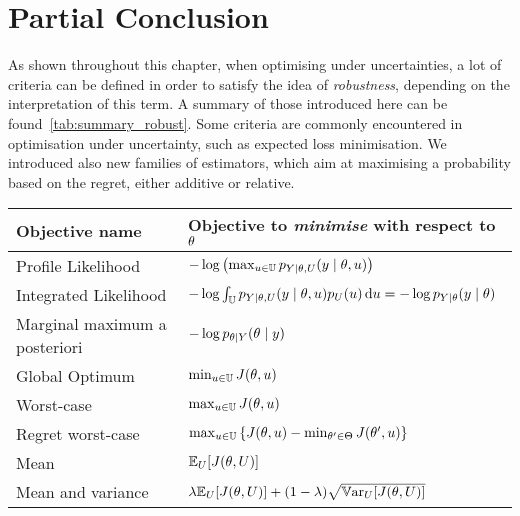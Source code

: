 \documentclass[../../Main_ManuscritThese.tex]{subfiles}
\begin{document}
\section{Partial Conclusion}
\label{sec:ch3_partial_ccl}
As shown throughout this chapter, when optimising under uncertainties, a
lot of criteria can be defined in order to satisfy the idea of
\emph{robustness}, depending on the interpretation of this term. A
summary of those introduced here can be
found~\cref{tab:summary_robust}. Some criteria are commonly
encountered in optimisation under uncertainty, such as expected loss
minimisation. We introduced also new families of estimators, which aim
at maximising a probability based on the regret, either additive or
relative.
\begin{table}[ht]
  \centering
  \begin{tabular}{ll}
    \toprule
    Objective name                & Objective to \emph{minimise} with respect to  $\theta$                                                                                 \\ \midrule
    Profile Likelihood            & $-\log \left(\max_{u \in \mathbb{U}} p_{Y \mid \theta, U}(y \mid \theta, u)\right)$                                       \\
    Integrated Likelihood         & $-\log \int_{\mathbb{U}} p_{Y \mid \theta, U}(y \mid \theta, u)p_{U}(u) \,\mathrm{d}u=-\log p_{Y\mid \theta}(y\mid \theta)$ \\
    Marginal maximum a posteriori & $-\log p_{\theta\mid Y}(\theta \mid y)$                                                                                      \\ \midrule
    Global Optimum                & $\min_{u\in\mathbb{U}} J(\theta, u)$                                                                                     \\
    Worst-case                    & $\max_{u \in \mathbb{U}} J(\theta, u)$                                                                                   \\
    Regret worst-case             & $\max_{u\in\mathbb{U}}\left\{J(\theta, u) - \min_{\theta^{\prime}\in\Theta} J(\theta^{\prime}, u)\right\}$                  \\ \midrule
    Mean                          & $\mathbb{E}_{U}[J(\theta, U)]$                                                                                               \\
    Mean and variance             & $ \lambda \mathbb{E}_{U}[J(\theta, U)] + (1-\lambda) \sqrt{\mathbb{V}\mathrm{ar}_{U}[J(\theta, U)]}$                                         \\ \midrule

\end{tabular}
\end{table}
\end{document}
